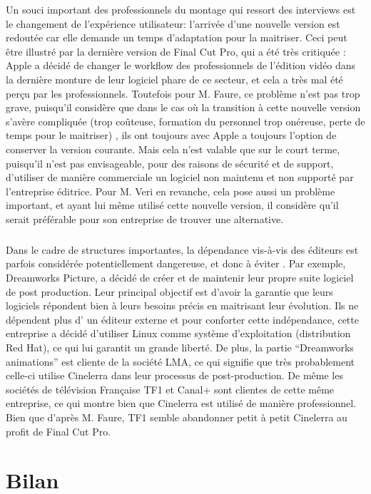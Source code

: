Un souci important des professionnels du montage qui ressort
des interviews est le changement de l'expérience utilisateur:
l'arrivée d'une nouvelle version est redoutée car elle demande un
temps d'adaptation pour la maitriser.  Ceci peut être illustré par
la dernière version de Final Cut Pro, qui a été très critiquée
\cite{FinalCutProXReviews}: Apple a décidé de changer le workflow
 des professionnels de l'édition vidéo dans la dernière
monture de leur logiciel phare de ce secteur, et cela a très mal été
perçu par les professionnels. Toutefois pour M. Faure, ce problème n'est
pas trop grave, puisqu'il considère que dans le cas où la transition
à cette nouvelle version s'avère compliquée (trop coûteuse, formation
du personnel trop onéreuse, perte de temps pour le maitriser) , ils ont
toujours avec Apple a toujours l'option de conserver la version courante.
Mais cela n'est valable que sur le court terme, puisqu'il n'est pas
envisageable, pour des raisons de sécurité et de support, d'utiliser
de manière commerciale un logiciel non maintenu et non supporté par
l'entreprise éditrice. Pour M. Veri en revanche, cela pose aussi un
problème important, et ayant lui même utilisé cette nouvelle version,
il considère qu'il serait préférable pour son entreprise de trouver
une alternative.

\subparagraph{}

Dans le cadre de structures importantes, la dépendance vis-à-vis
des éditeurs est parfois considérée potentiellement dangereuse,
et donc à éviter . Par exemple, Dreamworks Picture, a décidé de
créer et de maintenir leur propre suite logiciel \cite {Dreamworks}
de post production. Leur principal objectif  est d'avoir la garantie que
leurs logiciels répondent bien à leurs besoins précis en maitrisant
leur évolution. Ils ne dépendent plus d' un éditeur externe et pour
conforter cette indépendance, cette entreprise a décidé d'utiliser
Linux comme système d'exploitation (distribution Red Hat), ce qui lui
garantit un grande liberté. De plus, la partie ``Dreamworks animations''
est cliente de la société LMA, ce qui signifie que très probablement
celle-ci utilise Cinelerra dans leur processus de post-production. De
même les sociétés de télévision Française TF1 et Canal+ sont
clientes de cette même entreprise, ce qui montre bien que Cinelerra
est utilisé de manière professionnel. Bien que d'après M. Faure,
TF1 semble abandonner petit à petit Cinelerra au profit de Final Cut Pro.

\newpage

\section {Bilan}

